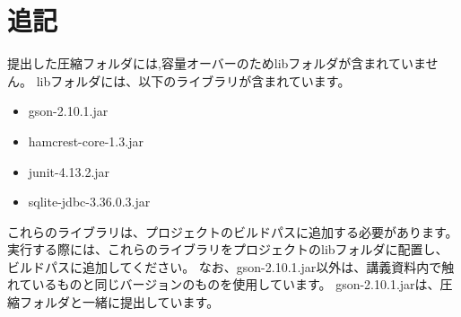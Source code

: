 \documentclass[uplatex,dvipdfmx,a4paper]{jsarticle}
\begin{document}
\section*{追記}
提出した圧縮フォルダには,容量オーバーのためlibフォルダが含まれていません。
libフォルダには、以下のライブラリが含まれています。
\begin{itemize}
  \item gson-2.10.1.jar
  \item hamcrest-core-1.3.jar
  \item junit-4.13.2.jar
  \item sqlite-jdbc-3.36.0.3.jar
\end{itemize}
これらのライブラリは、プロジェクトのビルドパスに追加する必要があります。
実行する際には、これらのライブラリをプロジェクトのlibフォルダに配置し、ビルドパスに追加してください。
なお、gson-2.10.1.jar以外は、講義資料内で触れているものと同じバージョンのものを使用しています。
gson-2.10.1.jarは、圧縮フォルダと一緒に提出しています。
\end{document}

